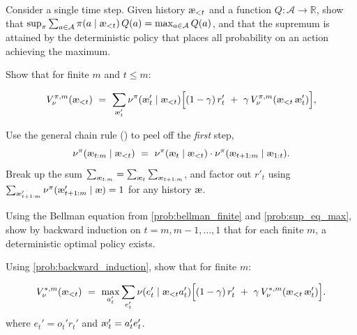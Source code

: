 \documentclass[fontsize=11pt, parskip=half]{scrartcl}
\newcommand{\cA}{\mathcal{A}}
\newcommand{\aes}{\textnormal{\ae}}
\begin{document}
\begin{exercise}
\label{prob:sup_eq_max}
Consider a single time step. Given history $\aes_{<t}$ and a function $Q : \cA \to \mathbb{R}$, show that $\sup_\pi \sum_{a \in \cA} \pi(a \mid \aes_{<t})\, Q(a) = \max_{a \in \cA} Q(a)$, and that the supremum is attained by the deterministic policy that places all probability on an action achieving the maximum.

\end{exercise}


\begin{exercise}
\label{prob:bellman_finite}
Show that for finite $m$ and $t \leq m$:

\[
    V_\nu^{\pi,m}(\aes_{<t}) ~=~ \sum_{\aes'_t} \nu^\pi(\aes'_t \mid \aes_{<t}) \Big[(1-\gamma)\, r'_t ~+~ \gamma\, V_\nu^{\pi,m}(\aes_{<t}\, \aes'_t)\Big],
\]

\begin{hint}
Use the general chain rule () to peel off the
\emph{first} step,
\[
    \nu^\pi(\aes_{t:m} \mid \aes_{<t})
    ~=~ \nu^\pi(\aes_t \mid \aes_{<t}) \cdot \nu^\pi(\aes_{t+1:m} \mid \aes_{1:t}).
\]
Break up the sum $\sum_{\aes_{t:m}} = \sum_{\aes_t} \sum_{\aes_{t+1:m}}$,
and factor out $r'_t$ using $\sum_{\aes'_{t+1:m}} \nu^\pi(\aes'_{t+1:m} \mid \aes) = 1$
for any history $\aes$.
\end{hint}
\end{exercise}


\begin{exercise}
\label{prob:backward_induction}
\skippable
Using the Bellman equation from \cref{prob:bellman_finite} and \cref{prob:sup_eq_max}, show by backward induction on $t = m, m-1, \ldots, 1$ that for each finite $m$, a deterministic optimal policy exists.

\end{exercise}


\begin{exercise}
\label{prob:bellman_opt}
Using \cref{prob:backward_induction}, show that for finite $m$:

\[
    V_\nu^{*,m}(\aes_{<t}) ~=~ \max_{a'_t} \sum_{e'_t} \nu(e'_t \mid \aes_{<t} a'_t) \Big[(1-\gamma)\, r'_t ~+~ \gamma\, V_\nu^{*,m}(\aes_{<t}\, \aes'_t)\Big].
\]
where $e_t' = o_t' r_t'$ and $\aes'_t = a'_t e'_t$.
\end{exercise}
\end{document}
